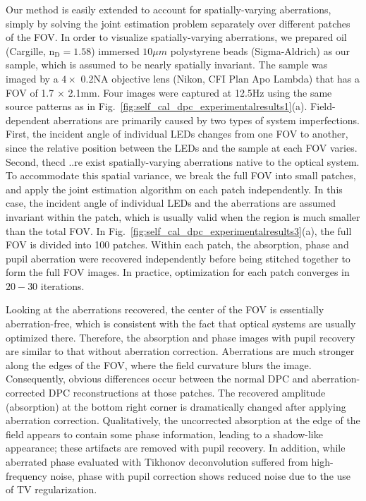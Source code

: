Our method is easily extended to account for spatially-varying aberrations, simply by solving the joint estimation problem separately over different patches of the FOV. In order to visualize spatially-varying aberrations, we prepared oil (Cargille, $\mathrm{n}_{\mathrm{D}}=1.58$) immersed $10\mu m$ polystyrene beads (Sigma-Aldrich) as our sample, which is assumed to be nearly spatially invariant. The sample was imaged by a $4\times$ $0.2 \mathrm{NA}$ objective lens (Nikon, CFI Plan Apo Lambda) that has a FOV of 1.7 $\times$ 2.1mm. Four images were captured at 12.5Hz using the same source patterns as in Fig.~\ref{fig:self_cal_dpc_experimentalresults1}(a). Field-dependent aberrations are primarily caused by two types of system imperfections. First, the incident angle of individual LEDs changes from one FOV to another, since the relative position between the LEDs and the sample at each FOV varies. Second, thecd ..re exist spatially-varying aberrations native to the optical system. To accommodate this spatial variance, we break the full FOV into small patches, and apply the joint estimation algorithm on each patch independently. In this case, the incident angle of individual LEDs and the aberrations are assumed invariant within the patch, which is usually valid when the region is much smaller than the total FOV. In Fig.~\ref{fig:self_cal_dpc_experimentalresults3}(a), the full FOV is divided into 100 patches. Within each patch, the absorption, phase and pupil aberration were recovered independently before being stitched together to form the full FOV images. In practice, optimization for each patch converges in $20-30$ iterations.

Looking at the aberrations recovered, the center of the FOV is essentially aberration-free, which is consistent with the fact that optical systems are usually optimized there. Therefore, the absorption and phase images with pupil recovery are similar to that without aberration correction. Aberrations are much stronger along the edges of the FOV, where the field curvature blurs the image. Consequently, obvious differences occur between the normal DPC and aberration-corrected DPC reconstructions at those patches. The recovered amplitude (absorption) at the bottom right corner is dramatically changed after applying aberration correction. Qualitatively, the uncorrected absorption at the edge of the field appears to contain some phase information, leading to a shadow-like appearance; these artifacts are removed with pupil recovery. In addition, while aberrated phase evaluated with Tikhonov deconvolution suffered from high-frequency noise, phase with pupil correction shows reduced noise due to the use of TV regularization.


